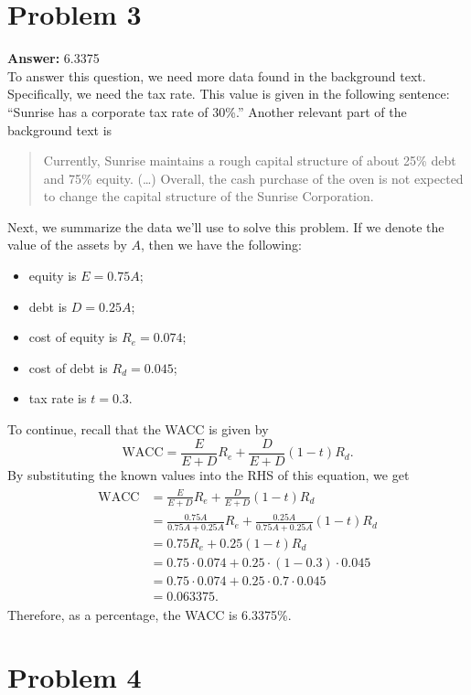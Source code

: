 \documentclass[11pt]{article}
\begin{document}
\section*{Problem 3}
\label{sec:org03507bd}

\textbf{Answer:} 6.3375\\

To answer this question, we need more data found in the background text.
Specifically, we need the tax rate. This value is given in the following
sentence: ``Sunrise has a corporate tax rate of 30\%.'' Another relevant part of
the background text is
\begin{quote}
Currently, Sunrise maintains a rough capital structure of about 25\% debt and 75\%
equity. (\ldots{}) Overall, the cash purchase of the oven is not expected to change
the capital structure of the Sunrise Corporation.
\end{quote}
Next, we summarize the data we'll use to solve this problem. If we denote the
value of the assets by \(A\), then we have the following:
\begin{itemize}
\item equity is \(E=0.75 A\);
\item debt is \(D=0.25 A\);
\item cost of equity is \(R_e=0.074\);
\item cost of debt is \(R_d=0.045\);
\item tax rate is \(t=0.3\).
\end{itemize}
To continue, recall that the WACC is given by
\begin{equation}
\mathrm{WACC}=\frac{E}{E+D}R_e+\frac{D}{E+D}(1-t)R_d.
\end{equation}
By substituting the known values into the RHS of this equation, we get
\begin{align}
  \begin{split}
    \mathrm{WACC}&=\frac{E}{E+D}R_e+\frac{D}{E+D}(1-t)R_d\\
    &=\frac{0.75 A}{0.75 A+0.25 A}R_e+\frac{0.25 A}{0.75 A+0.25 A}(1-t)R_d\\
    &=0.75R_e+0.25(1-t)R_d\\
    &=0.75\cdot 0.074+0.25\cdot(1-0.3)\cdot 0.045\\
    &=0.75\cdot 0.074+0.25\cdot 0.7\cdot 0.045\\
    &=0.063375.
  \end{split}
\end{align}
Therefore, as a percentage, the WACC is 6.3375\%.
\section*{Problem 4}
\label{sec:orgcc2623a}
\end{document}

